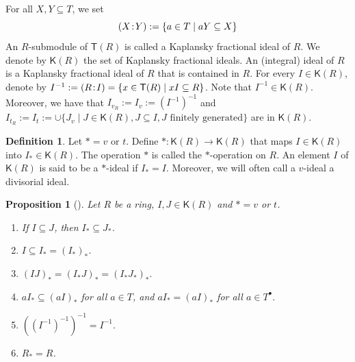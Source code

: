 \documentclass[a4paper, 10pt]{amsart}
\newcommand{\defit}[1]{{\textsf{#1}}}
\theoremstyle{plain}
\newtheorem{proposition}[theorem]{Proposition}
\theoremstyle{definition}
\newtheorem{definition}[theorem]{Definition}
\theoremstyle{remark}
\newcommand{\DP}{\negthinspace : \negthinspace}
\numberwithin{equation}{section}
\begin{document}
    For all $X,Y\subseteq T$, we set 
    \[(X\DP Y) :=\{a\in T\mid aY\subseteq X\} \] 
 An $R$-submodule of $\mathsf{T}(R)$ is called a \defit{Kaplansky fractional ideal} of $R$. We denote by $\mathsf{K}(R)$ the set of Kaplansky fractional ideals. An \defit{(integral) ideal} of $R$ is a Kaplansky fractional ideal of $R$ that is contained in $R$.
For every  $I \in \mathsf{K}(R)$, denote by $I^{-1}:=(R\DP I) =\{x \in \mathsf T(R) \mid xI \subseteq R\}$. Note that $I^{-1} \in \mathsf K(R)$. Moreover, we have that $I_{v_R}:=I_v:=(I^{-1})^{-1}$ and $I_{t_R}:=I_t:=\cup \{J_v \mid J\in \mathsf{K}(R), J\subseteq I, J \,\,\text{finitely generated}\}$ are in $\mathsf K(R)$.

\begin{definition} Let $\ast= v \text{ or } t$. Define $\ast \colon \mathsf{K}(R)\to\mathsf{K}(R)$ that maps  $I \in \mathsf{K}(R)$ into $I_{\ast}\in \mathsf{K}(R)$. The operation $\ast$ is called the $\ast$-\textsf{operation} on $R$. An element $I$ of $\mathsf{K}(R)$ is said to be a $\ast$-ideal if $I_{\ast}=I$. Moreover, we will often call a $v$-ideal a \defit{divisorial} ideal.
\end{definition}

\begin{proposition}[{\cite[Proposition 2.4.26]{El19}}]\label{prop:semistar operation}
    Let $R$ be a ring, $I,J\in \mathsf{K}(R)$ and $*=v$ or $t$.
    \begin{enumerate}[label=\textup(\normalfont \arabic*\textup)]
        \item If $I\subseteq J$, then $I_*\subseteq J_*$.
        \item $I\subseteq I_*=(I_*)_*$.
        \item $(IJ)_*=(I_*J)_*=(I_*J_*)_*.$
        \item $aI_*\subseteq (aI)_*$ for all $a\in T$, and $aI_*= (aI)_*$ for all $a\in T^\bullet.$ 
        \item $((I^{-1})^{-1})^{-1}=I^{-1}.$
         \item $R_*=R$.
    \end{enumerate} 
\end{proposition}
\end{document}
